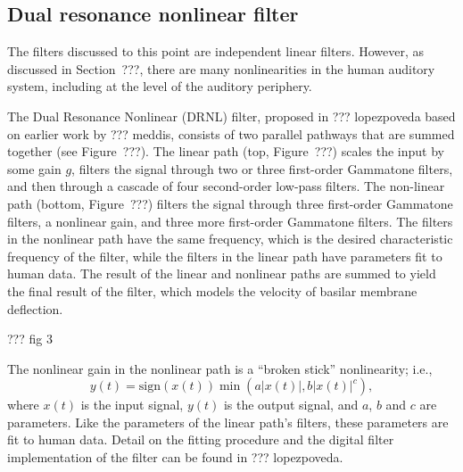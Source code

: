 

\subsection{Dual resonance nonlinear filter}

The filters discussed to this point
are independent linear filters.
However, as discussed in Section~???,
there are many nonlinearities
in the human auditory system,
including at the level of the auditory periphery.

The Dual Resonance Nonlinear (DRNL) filter,
proposed in ??? lopezpoveda
based on earlier work by ??? meddis,
consists of two parallel pathways
that are summed together
(see Figure~???).
The linear path (top, Figure~???)
scales the input by some gain $g$,
filters the signal through
two or three first-order Gammatone filters,
and then through a cascade of
four second-order low-pass filters.
The non-linear path (bottom, Figure~???)
filters the signal through
three first-order Gammatone filters,
a nonlinear gain,
and three more first-order Gammatone filters.
The filters in the nonlinear path
have the same frequency,
which is the desired characteristic frequency
of the filter,
while the filters in the linear path
have parameters fit to human data.
The result of the linear and nonlinear paths
are summed to yield
the final result of the filter,
which models the velocity of
basilar membrane deflection.

??? fig 3

The nonlinear gain in the nonlinear path
is a ``broken stick'' nonlinearity;
i.e.,
\begin{equation}
  y(t) = \text{sign}(x(t)) \min(a |x(t)|, b |x(t)|^c),
\end{equation}
where $x(t)$ is the input signal,
$y(t)$ is the output signal,
and $a$, $b$ and $c$ are parameters.
Like the parameters of the linear path's filters,
these parameters are fit to human data.
Detail on the fitting procedure
and the digital filter implementation
of the filter can be found in ??? lopezpoveda.

